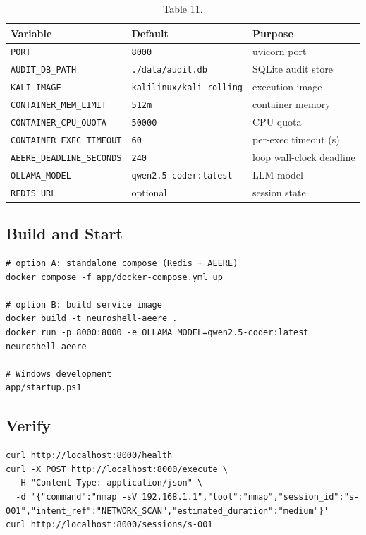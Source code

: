 \documentclass[10pt,journal,onecolumn]{IEEEtran}
\begin{document}
\begin{table}[h]
\caption{Table 11.}
\label{tab:t11}
\begin{tabularx}{\columnwidth}{l >{\raggedright\arraybackslash}X >{\raggedright\arraybackslash}X}
\toprule
\textbf{Variable} & \textbf{Default} & \textbf{Purpose}\\
\midrule
\texttt{PORT} & \texttt{8000} & uvicorn port\\
\texttt{AUDIT\_DB\_PATH} & \texttt{./data/audit.db} & SQLite audit store\\
\texttt{KALI\_IMAGE} & \texttt{kalilinux/kali-rolling} & execution image\\
\texttt{CONTAINER\_MEM\_LIMIT} & \texttt{512m} & container memory\\
\texttt{CONTAINER\_CPU\_QUOTA} & \texttt{50000} & CPU quota\\
\texttt{CONTAINER\_EXEC\_TIMEOUT} & \texttt{60} & per-exec timeout (s)\\
\texttt{AEERE\_DEADLINE\_SECONDS} & \texttt{240} & loop wall-clock deadline\\
\texttt{OLLAMA\_MODEL} & \texttt{qwen2.5-coder:latest} & LLM model\\
\texttt{REDIS\_URL} & optional & session state\\
\bottomrule
\end{tabularx}
\end{table}

\subsection{Build and Start}

\begin{lstlisting}
# option A: standalone compose (Redis + AEERE)
docker compose -f app/docker-compose.yml up

# option B: build service image
docker build -t neuroshell-aeere .
docker run -p 8000:8000 -e OLLAMA_MODEL=qwen2.5-coder:latest neuroshell-aeere

# Windows development
app/startup.ps1
\end{lstlisting}

\subsection{Verify}

\begin{lstlisting}
curl http://localhost:8000/health
curl -X POST http://localhost:8000/execute \
  -H "Content-Type: application/json" \
  -d '{"command":"nmap -sV 192.168.1.1","tool":"nmap","session_id":"s-001","intent_ref":"NETWORK_SCAN","estimated_duration":"medium"}'
curl http://localhost:8000/sessions/s-001
\end{lstlisting}
\end{document}
